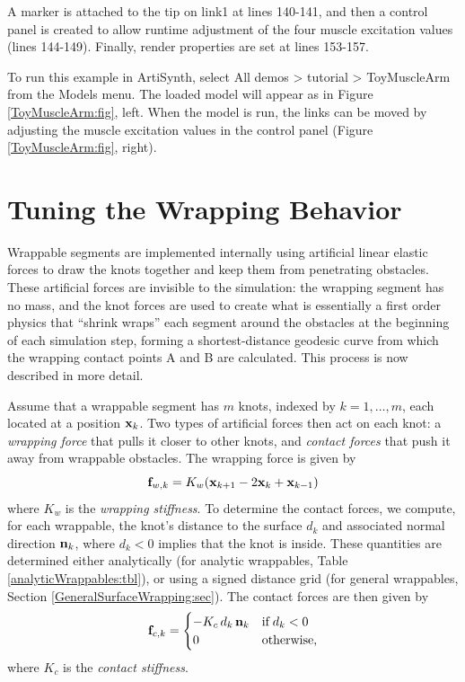 A marker is attached to the tip on link1 at lines 140-141, and then a control
panel is created to allow runtime adjustment of the four muscle excitation
values (lines 144-149). Finally, render properties are set at lines 153-157.

To run this example in ArtiSynth, select {\sf All demos > tutorial >
ToyMuscleArm} from the {\sf Models} menu. The loaded model will appear as in
Figure \ref{ToyMuscleArm:fig}, left. When the model is run, the links can be
moved by adjusting the muscle excitation values in the control panel
(Figure \ref{ToyMuscleArm:fig}, right).

\section{Tuning the Wrapping Behavior}
\label{wrapTuning:sec}

Wrappable segments are implemented internally using artificial linear
elastic forces to draw the knots together and keep them from
penetrating obstacles. These artificial forces are invisible to the
simulation: the wrapping segment has no mass, and the knot forces are
used to create what is essentially a first order physics that ``shrink
wraps'' each segment around the obstacles at the beginning of each
simulation step, forming a shortest-distance geodesic curve from
which the wrapping contact points A and B are calculated. This process
is now described in more detail.

Assume that a wrappable segment has $m$ knots, indexed by $k =
1, \ldots, m$, each located at a position ${\bf x}_k$. Two types of
artificial forces then act on each knot: a {\it wrapping force}
that pulls it closer to other knots, and {\it contact forces} that
push it away from wrappable obstacles. The wrapping force is given by
%
\begin{equation*}
{\bf f}_{w,k} = K_w ({\bf x}_{k+1} - 2 {\bf x}_k + {\bf x}_{k-1})
\end{equation*}
%
where $K_w$ is the {\it wrapping stiffness}. To determine the contact
forces, we compute, for each wrappable, the knot's distance to the
surface $d_k$ and associated normal direction ${\bf n}_k$, where $d_k < 0$
implies that the knot is inside. These quantities are determined
either analytically (for analytic wrappables, Table
\ref{analyticWrappables:tbl}), or using a signed distance grid (for
general wrappables, Section \ref{GeneralSurfaceWrapping:sec}).  The
contact forces are then given by
%
\begin{equation*}
{\bf f}_{c,k} = 
\begin{cases}
-K_c \, d_k \, {\bf n}_k & \text{if} \; d_k < 0 \\
0 & \text{otherwise},
\end{cases}
\end{equation*}
%
where $K_c$ is the {\it contact stiffness}.

